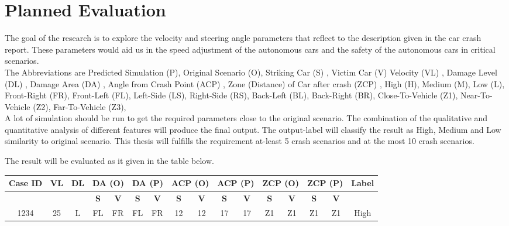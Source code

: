 \section{Planned Evaluation}

The goal of the research is to explore the velocity and steering angle parameters that reflect to the description given in the car crash report. These parameters would aid us in the speed adjustment of the autonomous cars and the safety of the autonomous cars in critical scenarios. 
\\ 

The Abbreviations are Predicted Simulation (P),  
 Original Scenario  (O), 
 Striking Car  (S) , 
 Victim Car (V) 
 Velocity  (VL) , 
 Damage Level (DL) ,  
 Damage Area (DA) ,    
 Angle from Crash Point (ACP) , 
 Zone (Distance) of Car after crash (ZCP) , 
 High (H), 
 Medium (M),  
 Low (L), 
 Front-Right (FR), 
 Front-Left (FL),  
 Left-Side (LS), 
 Right-Side (RS), 
 Back-Left (BL),  
 Back-Right (BR), 
 Close-To-Vehicle (Z1), 
 Near-To-Vehicle (Z2),  
 Far-To-Vehicle (Z3), \\



A lot of simulation should be run to get the required parameters close to the original scenario. The combination of the qualitative and quantitative analysis of different features will produce the final output. The output-label will classify the result as High, Medium and Low similarity to original scenario. This thesis will fulfills the requirement at-least 5 crash scenarios and at the most 10 crash scenarios. 

The result will be evaluated as it given in the table below.

\begin{table}[h!]
\centering
\begin{tabular}{| *{16}{c|} }

    \hline
Case ID & VL & DL  
& \multicolumn{2}{c|}{DA (O)}
& \multicolumn{2}{c|}{DA (P)}
            & \multicolumn{2}{c|}{ACP (O)}
            & \multicolumn{2}{c|}{ACP (P)}
                    & \multicolumn{2}{c|}{ZCP (O)}
                    & \multicolumn{2}{c|}{ZCP (P)}
                            & \multicolumn{1}{c|}{Label}                \\
    \hline
  & &   &   \textbf{S}  &   \textbf{V} &   \textbf{S}  &   \textbf{V} &   \textbf{S}  &   \textbf{V} &   \textbf{S}  &   \textbf{V}  &   \textbf{S}  &   \textbf{V}  &   \textbf{S}  &   \textbf{V}  &    \\
    \hline
1234   & 25 &   L  &   FL  &   FR &   FL  &   FR  &   12  &   12 &   17  &   17  &   Z1  &   Z1 &   Z1  &   Z1 &   High  \\
    \hline
\end{tabular}
\end{table}


